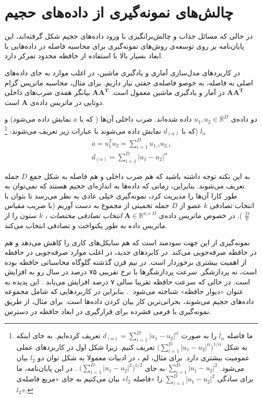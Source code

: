 \section{
چالش‌های نمونه‌گیری از داده‌های حجیم
}
در حالی که مسائل جذاب و چالش‌برانگیزی با ورود داده‌های حجیم شکل گرفته‌اند، این پایان‌نامه بر روی توسعه‌ی روش‌های نمونه‌گیری برای محاسبه فاصله در داده‌هایی با ابعاد بسیار بالا با استفاده از حافظه محدود تمرکز دارد.

در کاربردهای مدل‌سازی آماری و یادگیری ماشین، در اغلب موارد به جای داده‌های اصلی به فاصله، به خوصو فاصله‌ی جفتی نیاز داریم. برای مثال، محاسبه ماتریس گرام
$\mathbf{AA^T}$
در آمار و یادگیری ماشین معمول است. 
$\mathbf{AA^T}$
بیانگر همه‌ی ضرب‌های داخلی دوتایی در ماتریس داده‌ی 
‌$\mathbf{A}$
است.

دو داده‌ی 
$u_1, u_2 \in \mathbb{R}^D$
داده شده‌اند. ضرب داخلی آن‌ها ( که با 
$a$
نمایش داده می‌شود) و 
$l_\alpha$
(که با 
$d_{(\alpha)}$
نمایش داده می‌شوند با عبارات زیر تعریف می‌شوند:
\footnote{
ما فاصله $l_\alpha$ را به صورت 
$d_{(\alpha)} = \sum_{i=1}^{D} \mathopen| u_1 - u_2 \mathclose|^\alpha$
تعریف کرده‌ایم. به جای اینکه به شکل
$\mathopen( \sum_{i=1}^{D} \mathopen| u_1 - u_2 \mathclose|^\alpha \mathclose)^{1/\alpha}$
تعریف کنیم. زیرا شکل اول در کاربردهای عملی عمومیت بیشتری دارد. برای مثال، لم 
، در ادبیات معمولا به شکل توان دو $l_2$ بیان می‌شود. 
$\sum_{i=1}^{D} \mathopen| u_1 - u_2 \mathclose|^2$
به جای 
$\mathopen( \sum_{i=1}^{D} \mathopen| u_1 - u_2 \mathclose|^2 \mathclose)^{1/2}$
. در این پایان‌نامه، ما برای سادگی 
$\sum_{i=1}^{D} \mathopen| u_1 - u_2 \mathclose|^2$
را «فاصله $l_2$» بیان می‌کنیم به جای «مربع فاصله‌ی $l_2$».
}
\begin{align}
a=u_1^T u_2 = \sum_{i=1}^{D} u_{1,i} u_{2,i} \\
d_{(\alpha)} = \sum_{i=1}^{D} \mathopen| u_1 - u_2 \mathclose|^\alpha 
\label{eq:1hP}
\end{align}

به این نکته توجه داشته باشید که هم ضرب داخلی و هم فاصله به شکل جمع
$D$
جمله تعریف می‌شوند. بنابراین، زمانی که داده‌ها به اندازه‌ای حجیم هستند که نمی‌توان به طور کارا آن‌ها را مدیریت کرد، نمونه‌گیری خیلی عادی به نظر می‌رسد تا بتوان با انتخاب تصادفی 
$k$
عضو از 
$D$
جمله تخمینی از مجموع به دست آوریم
(با ضریب مقیاس 
$\frac{D}{k}$
). در خصوص ماتریس داده‌ی 
$\mathbf{A} \in \mathbb{R}^{n \times D}$
\textit{
انتخاب تصادفی مختصات
}
، $k$ ستون را از ماتریس داده به طور یکنواخت و تصادفی انتخاب می‌کند.

نمونه‌گیری از این جهت سودمند است که هم سایکل‌های کاری 
را کاهش ‌می‌دهد و هم در حافظه صرفه‌جویی می‌کند. در کابردهای جدید، در اغلب موارد صرفه‌جویی در حافظه از اهمیت بیشتری برخوردار است. در نیم قرن گذشته گلوگاه‌ محاسباتی حافظه بوده است، نه پردازشگر. سرعت پردازشگرها با نرخ تقریبی ۷۵ درصد در سال رو به افزایش است. در حالی که سرعت حافظه تقریبا سالی ۷ درصد افزایش می‌یابد
\cite{litez139}
. این پدیده به عنوان «دیوار حافظه»
شناخته می‌شود
‌\cite{litez139, litez168}
. بنابراین در کاربردهایی که شامل مجموعه داده‌های حجیم می‌شوند، بحرانی‌ترین کار بیان کردن داده‌ها است. برای مثال،
از طریق نمونه‌گیری با فرمی فشرده برای قرارگیری در ابعاد حافظه در دسترس.


